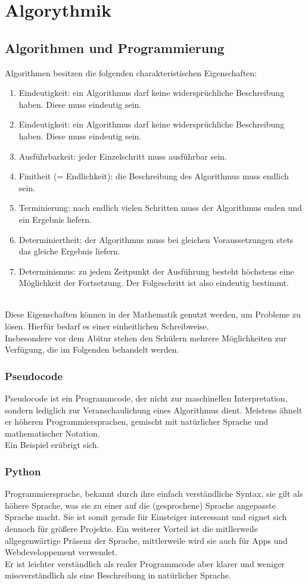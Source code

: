 \chapter{Algorythmik}
\section{Algorithmen und Programmierung}
\begin{Definition}
	Algorithmen besitzen die folgenden charakteristischen Eigenschaften:
	\begin{enumerate}
		\item Eindeutigkeit: ein Algorithmus darf keine widersprüchliche Beschreibung haben. Diese muss eindeutig sein.
		\item Eindeutigkeit: ein Algorithmus darf keine widersprüchliche Beschreibung haben. Diese muss eindeutig sein.
		\item Ausführbarkeit: jeder Einzelschritt muss ausführbar sein.
		\item Finitheit (= Endlichkeit): die Beschreibung des Algorithmus muss endlich sein.
		\item Terminierung: nach endlich vielen Schritten muss der Algorithmus enden und ein Ergebnis liefern.
		\item Determiniertheit: der Algorithmus muss bei gleichen Voraussetzungen stets das gleiche Ergebnis liefern.
		\item   Determinismus: zu jedem Zeitpunkt der Ausführung besteht höchstens eine Möglichkeit der Fortsetzung. Der Folgeschritt ist also eindeutig bestimmt.
	\end{enumerate}
\end{Definition}
\\
Diese Eigenschaften können in der Mathematik genutzt werden, um Probleme zu lösen. Hierfür bedarf es einer einheitlichen Schreibweise.\\
Insbesondere vor dem Abitur stehen den Schülern mehrere Möglichkeiten zur Verfügung, die im Folgenden behandelt werden.
\subsection{Pseudocode}
Pseudocode ist ein Programmcode, der nicht zur maschinellen Interpretation, sondern lediglich zur Veranschaulichung eines Algorithmus dient. Meistens ähnelt er höheren Programmiersprachen, gemischt mit natürlicher Sprache und mathematischer Notation.\\
Ein Beispiel erübrigt sich.
\subsection{Python}
Programmiersprache, bekannt durch ihre einfach verständliche Syntax, sie gilt als höhere Sprache, was sie zu einer auf die (gesprochene) Sprache angepasste Sprache macht. Sie ist somit gerade für Einsteiger interessant und eignet sich dennoch für größere Projekte. Ein weiterer Vorteil ist die mitllerweile allgegenwärtige Präsenz der Sprache, mittlerweile wird sie auch für Apps und Webdeveloppement verwendet.\\
Er ist leichter verständlich als realer Programmcode aber klarer und weniger missverständlich als eine Beschreibung in natürlicher Sprache.
